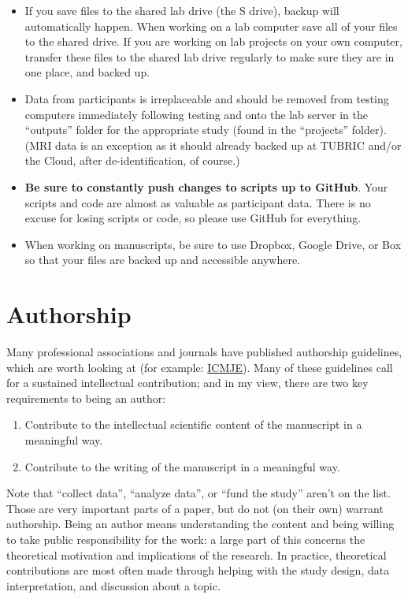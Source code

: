 \documentclass[letterpaper,12pt,oneside]{memoir}
\begin{document}
\begin{itemize}
\item If you save files to the shared lab drive (the S drive), backup will automatically happen. When working on a lab computer save all of your files to the shared drive. If you are working on lab projects on your own computer, transfer these files to the shared lab drive regularly to make sure they are in one place, and backed up.
\item Data from participants is irreplaceable and should be removed from testing computers immediately following testing and onto the lab server in the ``outputs'' folder for the appropriate study (found in the ``projects'' folder). (MRI data is an exception as it should already backed up at TUBRIC and/or the Cloud, after de-identification, of course.)
\item \textbf{Be sure to constantly push changes to scripts up to GitHub}. Your scripts and code are almost as valuable as participant data. There is no excuse for losing scripts or code, so please use GitHub for everything.
\item When working on manuscripts, be sure to use Dropbox, Google Drive, or Box so that your files are backed up and accessible anywhere.
\end{itemize}


\section{Authorship}
Many professional associations and journals have published authorship guidelines, which are worth looking at (for example: \href{http://www.icmje.org/recommendations/browse/roles-and-responsibilities/defining-the-role-of-authors-and-contributors.html}{ICMJE}). Many of these guidelines call for a sustained intellectual contribution; and in my view, there are two key requirements to being an author:

\begin{enumerate}
\item Contribute to the intellectual scientific content of the manuscript in a meaningful way.
\item Contribute to the writing of the manuscript in a meaningful way.
\end{enumerate}

Note that ``collect data'', ``analyze data'', or ``fund the study'' aren't on the list. Those are very important parts of a paper, but do not (on their own) warrant authorship. Being an author means understanding the content and being willing to take public responsibility for the work: a large part of this concerns the theoretical motivation and implications of the research. In practice, theoretical contributions are most often made through helping with the study design, data interpretation, and discussion about a topic.
\end{document}
